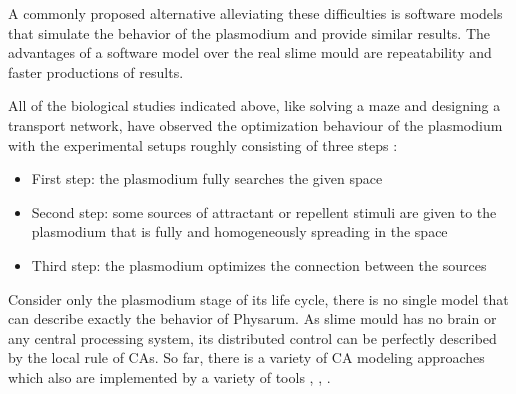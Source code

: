 \par
A commonly proposed alternative alleviating these difficulties is software models that simulate the behavior of the plasmodium and provide similar results. The advantages of a software model over the real slime mould are repeatability and faster productions of results.

\par
All of the biological studies indicated above, like solving a maze and designing a transport network, have observed the optimization behaviour of the plasmodium with the experimental setups roughly consisting of three steps \cite{shirakawa2015construction}:
\begin{itemize}
	\item First step: the plasmodium fully searches the given space
	\item Second step: some sources of attractant or repellent stimuli are given to the plasmodium that is fully and homogeneously spreading in the space
	\item Third step: the plasmodium optimizes the connection between the sources
\end{itemize}

\par
Consider only the plasmodium stage of its life cycle, there is no single model that can describe exactly the behavior of Physarum.
As slime mould has no brain or any central processing system, its distributed control can be perfectly described by the local rule of CAs. So far, there is a variety of CA modeling approaches which also are implemented by a variety of tools \cite{Tsompanas2016}, \cite{gunji2008minimal}, \cite{shirakawa2015construction}.


